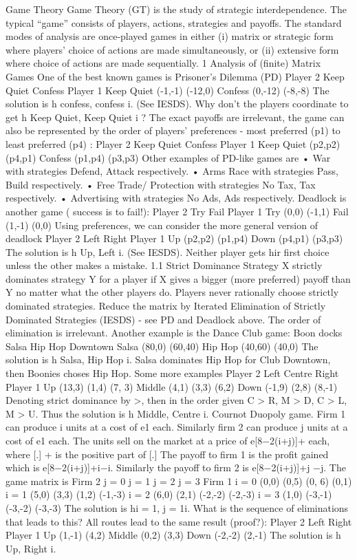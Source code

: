 Game Theory
Game Theory (GT) is the study of strategic interdependence. The typical “game” consists
of players, actions, strategies and payoffs. The standard modes of analysis are once-played
games in either
(i) matrix or strategic form where players’ choice of actions are made simultaneously,
or
(ii) extensive form where choice of actions are made sequentially.
1 Analysis of (finite) Matrix Games
One of the best known games is
Prisoner’s Dilemma (PD)
Player 2
Keep Quiet Confess
Player 1 Keep Quiet (-1,-1) (-12,0)
Confess (0,-12) (-8,-8)
The solution is h confess, confess i. (See IESDS).
Why don’t the players coordinate to get h Keep Quiet, Keep Quiet i ?
The exact payoffs are irrelevant, the game can also be represented by the order of players’
preferences - most preferred (p1) to least preferred (p4) :
Player 2
Keep Quiet Confess
Player 1 Keep Quiet (p2,p2) (p4,p1)
Confess (p1,p4) (p3,p3)
Other examples of PD-like games are
• War with strategies Defend, Attack respectively.
• Arms Race with strategies Pass, Build respectively.
• Free Trade/ Protection with strategies No Tax, Tax respectively.
• Advertising with strategies No Ads, Ads respectively.
Deadlock is another game ( success is to fail!):
Player 2
Try Fail
Player 1 Try (0,0) (-1,1)
Fail (1,-1) (0,0)
Using preferences, we can consider the more general version of deadlock
Player 2
Left Right
Player 1 Up (p2,p2) (p1,p4)
Down (p4,p1) (p3,p3)
The solution is h Up, Left i. (See IESDS). Neither player gets hir first choice unless the
other makes a mistake.
1.1 Strict Dominance
Strategy X strictly dominates strategy Y for a player if X gives a bigger (more preferred)
payoff than Y no matter what the other players do. Players never rationally choose strictly
dominated strategies.
Reduce the matrix by Iterated Elimination of Strictly Dominated Strategies
(IESDS) - see PD and Deadlock above. The order of elimination is irrelevant. Another
example is the Dance Club game:
Boon docks
Salsa Hip Hop
Downtown Salsa (80,0) (60,40)
Hip Hop (40,60) (40,0)
The solution is h Salsa, Hip Hop i. Salsa dominates Hip Hop for Club Downtown, then
Boonies choses Hip Hop.
Some more examples
Player 2
Left Centre Right
Player 1
Up (13,3) (1,4) (7, 3)
Middle (4,1) (3,3) (6,2)
Down (-1,9) (2,8) (8,-1)
Denoting strict dominance by >, then in the order given C > R, M > D, C > L, M > U.
Thus the solution is h Middle, Centre i.
Cournot Duopoly game. Firm 1 can produce i units at a cost of e1 each. Similarly firm
2 can produce j units at a cost of e1 each. The units sell on the market at a price of
e[8−2(i+j)]+ each, where [.]
+ is the positive part of [.] The payoff to firm 1 is the profit
gained which is e[8−2(i+j)]+i−i. Similarly the payoff to firm 2 is e[8−2(i+j)]+j −j.
The game matrix is
Firm 2
j = 0 j = 1 j = 2 j = 3
Firm 1
i = 0 (0,0) (0,5) (0, 6) (0,1)
i = 1 (5,0) (3,3) (1,2) (-1,-3)
i = 2 (6,0) (2,1) (-2,-2) (-2,-3)
i = 3 (1,0) (-3,-1) (-3,-2) (-3,-3)
The solution is hi = 1, j = 1i. What is the sequence of eliminations that leads to this?
All routes lead to the same result (proof?):
Player 2
Left Right
Player 1
Up (1,-1) (4,2)
Middle (0,2) (3,3)
Down (-2,-2) (2,-1)
The solution is h Up, Right i.

